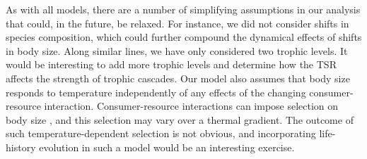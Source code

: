 \documentclass[11pt]{article}
\begin{document}


As with all models, there are a number of simplifying assumptions in our analysis that could, in the future, be relaxed.
For instance, we did not consider shifts in species composition, which could further compound the dynamical effects of shifts in body size. 
Along similar lines, we have only considered two trophic levels.
It would be interesting to add more trophic levels and determine how the TSR affects the strength of trophic cascades. 
Our model also assumes that body size responds to temperature independently of any effects of the changing consumer-resource interaction. 
Consumer-resource interactions can impose selection on body size \citep{Abrams1996}, and this selection may vary over a thermal gradient. 
The outcome of such temperature-dependent selection is not obvious, and incorporating life-history evolution in such a model would be an interesting exercise.
%
%
%
%
\end{document}
